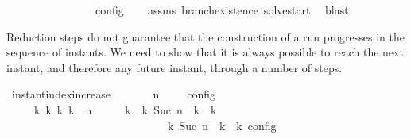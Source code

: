 \begin{isabellebody}
\ \ \ \ \ \ \ \ \ \ \ {\isasymand}\ {\isasymrho}\ {\isasymin}\ {\isasymlbrakk}\ {\isasymS}\ {\isasymrbrakk}\isactrlsub c\isactrlsub o\isactrlsub n\isactrlsub f\isactrlsub i\isactrlsub g{\isacartoucheclose}\isanewline
%
\isadelimproof
\ \ %
\endisadelimproof
%
\isatagproof
{}\isamarkupfalse%
\ assms\ branch{\isacharunderscore}existence{\isacharprime}\ solve{\isacharunderscore}start\ \isamarkupfalse%
\ blast%
\endisatagproof
{\isafoldproof}%
%
\isadelimproof
%
\endisadelimproof
%
\isadelimdocument
%
\endisadelimdocument
%
\isatagdocument
%
\isamarkuptrue%
%
\endisatagdocument
{\isafolddocument}%
%
\isadelimdocument
%
\endisadelimdocument
%
\begin{isamarkuptext}%
Reduction steps do not guarantee that the construction of a run progresses in the
  sequence of instants. We need to show that it is always possible to reach the next 
  instant, and therefore any future instant, through a number of steps.%
\end{isamarkuptext}\isamarkuptrue%
\isamarkupfalse%
\ instant{\isacharunderscore}index{\isacharunderscore}increase{\isacharcolon}\isanewline
\ \ \ {\isacartoucheopen}{\isasymrho}\ {\isasymin}\ {\isasymlbrakk}\ {\isasymGamma}{\isacharcomma}\ n\ {\isasymturnstile}\ {\isasymPsi}\ {\isasymtriangleright}\ {\isasymPhi}\ {\isasymrbrakk}\isactrlsub c\isactrlsub o\isactrlsub n\isactrlsub f\isactrlsub i\isactrlsub g{\isacartoucheclose}\isanewline
\ \ \ \ \ {\isacartoucheopen}{\isasymexists}{\isasymGamma}\isactrlsub k\ {\isasymPsi}\isactrlsub k\ {\isasymPhi}\isactrlsub k\ k{\isachardot}\ {\isacharparenleft}{\isacharparenleft}{\isasymGamma}{\isacharcomma}\ n\ {\isasymturnstile}\ {\isasymPsi}\ {\isasymtriangleright}\ {\isasymPhi}{\isacharparenright}\ \ {\isasymhookrightarrow}\isactrlbsup k\isactrlesup \ \ {\isacharparenleft}{\isasymGamma}\isactrlsub k{\isacharcomma}\ Suc\ n\ {\isasymturnstile}\ {\isasymPsi}\isactrlsub k\ {\isasymtriangleright}\ {\isasymPhi}\isactrlsub k{\isacharparenright}{\isacharparenright}\isanewline
\ \ \ \ \ \ \ \ \ \ \ \ \ \ \ \ \ \ \ \ \ \ \ \ \ {\isasymand}\ {\isasymrho}\ {\isasymin}\ {\isasymlbrakk}\ {\isasymGamma}\isactrlsub k{\isacharcomma}\ Suc\ n\ {\isasymturnstile}\ {\isasymPsi}\isactrlsub k\ {\isasymtriangleright}\ {\isasymPhi}\isactrlsub k\ {\isasymrbrakk}\isactrlsub c\isactrlsub o\isactrlsub n\isactrlsub f\isactrlsub i\isactrlsub g{\isacartoucheclose}\isanewline
%
\isadelimproof
%
\endisadelimproof
%
\isatagproof
{}\isamarkupfalse%

\end{isabellebody}
